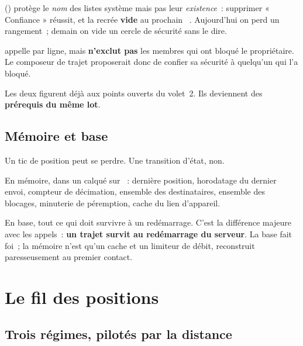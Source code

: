 \begin{alerte}
 () protège le \emph{nom} des
listes système mais pas leur \emph{existence}~: supprimer « Confiance » réussit, et
 la recrée \textbf{vide} au prochain
\mGET{}~. Aujourd'hui on perd un rangement~; demain on vide un
cercle de sécurité sans le dire.

 appelle  par ligne, mais
\textbf{n'exclut pas} les membres qui ont bloqué le propriétaire. Le composeur de trajet
proposerait donc de confier sa sécurité à quelqu'un qui l'a bloqué.

Les deux figurent déjà aux points ouverts du volet~2. Ils deviennent des \textbf{prérequis
du même lot}.
\end{alerte}

\section{Mémoire et base}

\begin{note}
Un tic de position peut se perdre. Une transition d'état, non.
\end{note}

En mémoire, dans un  calqué sur ~:
dernière position, horodatage du dernier envoi, compteur de décimation, ensemble des
destinataires, ensemble des blocages, minuterie de péremption, cache du lien d'appareil.

En base, tout ce qui doit survivre à un redémarrage. C'est la différence majeure avec les
appels~: \textbf{un trajet survit au redémarrage du serveur}. La base fait foi~; la mémoire
n'est qu'un cache et un limiteur de débit, reconstruit paresseusement au premier contact.

\chapter{Le fil des positions}

\section{Trois régimes, pilotés par la distance}

